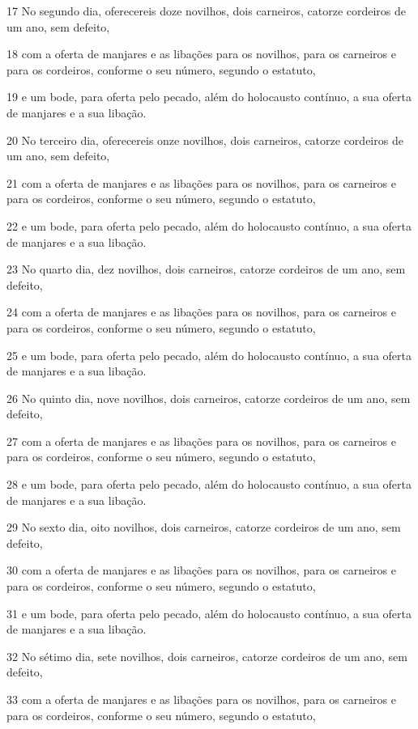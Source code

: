 \par 17 No segundo dia, oferecereis doze novilhos, dois carneiros, catorze cordeiros de um ano, sem defeito,
\par 18 com a oferta de manjares e as libações para os novilhos, para os carneiros e para os cordeiros, conforme o seu número, segundo o estatuto,
\par 19 e um bode, para oferta pelo pecado, além do holocausto contínuo, a sua oferta de manjares e a sua libação.
\par 20 No terceiro dia, oferecereis onze novilhos, dois carneiros, catorze cordeiros de um ano, sem defeito,
\par 21 com a oferta de manjares e as libações para os novilhos, para os carneiros e para os cordeiros, conforme o seu número, segundo o estatuto,
\par 22 e um bode, para oferta pelo pecado, além do holocausto contínuo, a sua oferta de manjares e a sua libação.
\par 23 No quarto dia, dez novilhos, dois carneiros, catorze cordeiros de um ano, sem defeito,
\par 24 com a oferta de manjares e as libações para os novilhos, para os carneiros e para os cordeiros, conforme o seu número, segundo o estatuto,
\par 25 e um bode, para oferta pelo pecado, além do holocausto contínuo, a sua oferta de manjares e a sua libação.
\par 26 No quinto dia, nove novilhos, dois carneiros, catorze cordeiros de um ano, sem defeito,
\par 27 com a oferta de manjares e as libações para os novilhos, para os carneiros e para os cordeiros, conforme o seu número, segundo o estatuto,
\par 28 e um bode, para oferta pelo pecado, além do holocausto contínuo, a sua oferta de manjares e a sua libação.
\par 29 No sexto dia, oito novilhos, dois carneiros, catorze cordeiros de um ano, sem defeito,
\par 30 com a oferta de manjares e as libações para os novilhos, para os carneiros e para os cordeiros, conforme o seu número, segundo o estatuto,
\par 31 e um bode, para oferta pelo pecado, além do holocausto contínuo, a sua oferta de manjares e a sua libação.
\par 32 No sétimo dia, sete novilhos, dois carneiros, catorze cordeiros de um ano, sem defeito,
\par 33 com a oferta de manjares e as libações para os novilhos, para os carneiros e para os cordeiros, conforme o seu número, segundo o estatuto,
